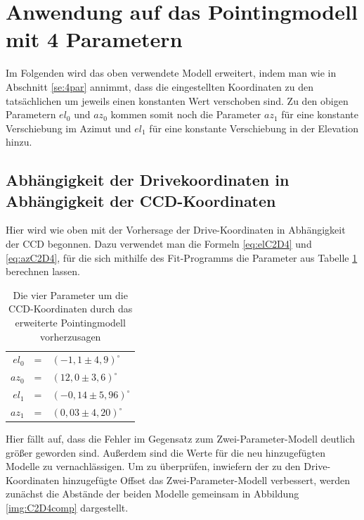 \section{Anwendung auf das Pointingmodell mit 4 Parametern}
Im Folgenden wird das oben verwendete Modell erweitert, indem man wie in Abschnitt \ref{se:4par} annimmt, dass die eingestellten Koordinaten zu den tatsächlichen um jeweils einen konstanten Wert verschoben sind. Zu den obigen Parametern $el_0$ und $az_0$ kommen somit noch die Parameter $az_1$ für eine konstante Verschiebung im Azimut und $el_1$ für eine konstante Verschiebung in der Elevation hinzu.
\subsection{Abhängigkeit der Drivekoordinaten in Abhängigkeit der CCD-Koordinaten}
Hier wird wie oben mit der Vorhersage der Drive-Koordinaten in Abhängigkeit der CCD begonnen. Dazu verwendet man die Formeln \ref{eq:elC2D4} und \ref{eq:azC2D4}, für die sich mithilfe des Fit-Programms die Parameter aus Tabelle \ref{tab:C2D4} berechnen lassen.
\begin{table}[htbp]
\centering
\begin{tabular}{rcl}
\toprule
$el_0$ &=& $(-1,1\pm 4,9)^{\circ}$\\
$az_0$ &=& $(12,0\pm 3,6)^{\circ}$\\
$el_1$ &=& $(-0,14\pm 5,96)^{\circ}$\\
$az_1$ &=& $(0,03\pm 4,20)^{\circ}$\\
\bottomrule
\end{tabular}
\caption{Die vier Parameter um die CCD-Koordinaten durch das erweiterte Pointingmodell vorherzusagen}
\label{tab:C2D4}
\end{table}
Hier fällt auf, dass die Fehler im Gegensatz zum Zwei-Parameter-Modell deutlich größer geworden sind. Außerdem sind die Werte für die neu hinzugefügten Modelle zu vernachlässigen. Um zu überprüfen, inwiefern der zu den Drive-Koordinaten hinzugefügte Offset das Zwei-Parameter-Modell verbessert, werden zunächst die Abstände der beiden Modelle gemeinsam in Abbildung \ref{img:C2D4comp} dargestellt.
